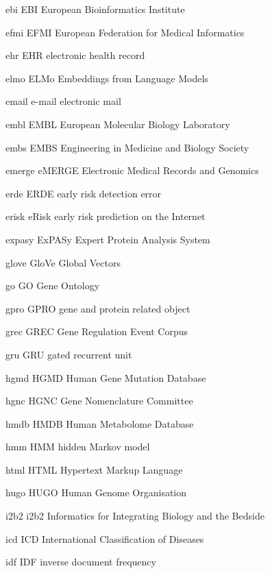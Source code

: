 \newabbreviation
{ebi}
{EBI}
{European Bioinformatics Institute}

\newabbreviation
{efmi}
{EFMI}
{European Federation for Medical Informatics}

\newabbreviation
{ehr}
{EHR}
{electronic health record}

\newabbreviation
{elmo}
{ELMo}
{Embeddings from Language Models}

\newabbreviation
{email}
{e-mail}
{electronic mail}

\newabbreviation
{embl}
{EMBL}
{European Molecular Biology Laboratory}

\newabbreviation
{embs}
{EMBS}
{Engineering in Medicine and Biology Society}

\newabbreviation
{emerge}
{eMERGE}
{Electronic Medical Records and Genomics}

\newabbreviation
{erde}
{ERDE}
{early risk detection error}

\newabbreviation
{erisk}
{eRisk}
{early risk prediction on the Internet}

\newabbreviation
{expasy}
{ExPASy}
{Expert Protein Analysis System}

\newabbreviation
{glove}
{GloVe}
{Global Vectors}

\newabbreviation
{go}
{GO}
{Gene Ontology}

\newabbreviation
{gpro}
{GPRO}
{gene and protein related object}

\newabbreviation
{grec}
{GREC}
{Gene Regulation Event Corpus}

\newabbreviation
{gru}
{GRU}
{gated recurrent unit}

\newabbreviation
{hgmd}
{HGMD}
{Human Gene Mutation Database}

\newabbreviation
{hgnc}
{HGNC}
{ Gene Nomenclature Committee}

\newabbreviation
{hmdb}
{HMDB}
{Human Metabolome Database}

\newabbreviation
{hmm}
{HMM}
{hidden Markov model}

\newabbreviation
{html}
{HTML}
{Hypertext Markup Language}

\newabbreviation
{hugo}
{HUGO}
{Human Genome Organisation}

\newabbreviation
{i2b2}
{i2b2}
{Informatics for Integrating Biology and the Bedside}

\newabbreviation
{icd}
{ICD}
{International Classification of Diseases}

\newabbreviation
{idf}
{IDF}
{inverse document frequency}

